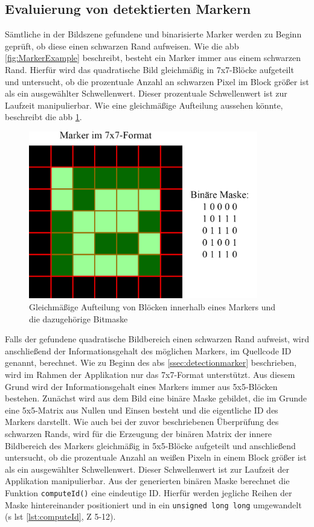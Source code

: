 \newpage

\subsection{Evaluierung von detektierten Markern}
Sämtliche in der Bildszene gefundene und binarisierte Marker werden zu Beginn geprüft, ob diese einen schwarzen Rand aufweisen. Wie die \acs{abb} \ref{fig:MarkerExample} beschreibt, besteht ein Marker immer aus einem schwarzen Rand. Hierfür wird das quadratische Bild gleichmäßig in 7x7-Blöcke aufgeteilt und untersucht, ob die prozentuale Anzahl an schwarzen Pixel im Block größer ist als ein ausgewählter Schwellenwert. Dieser prozentuale Schwellenwert ist zur Laufzeit manipulierbar. Wie eine gleichmäßige Aufteilung aussehen könnte, beschreibt die \acs{abb} \ref{fig:BlockSeparationMarker}.

\begin{figure}[H]
\centering
\includegraphics[width=10cm]{Bilder/Implementierung/marker_blocks.png}
\caption{Gleichmäßige Aufteilung von Blöcken innerhalb eines Markers und die dazugehörige Bitmaske}
\label{fig:BlockSeparationMarker}
\end{figure}

\noindent Falls der gefundene quadratische Bildbereich einen schwarzen Rand aufweist, wird anschließend der Informationsgehalt des möglichen Markers, im Quellcode \glqq ID\grqq{} genannt, berechnet. Wie zu Beginn des \acs{abs} \ref{ssec:detectionmarker} beschrieben, wird im Rahmen der Applikation nur das 7x7-Format unterstützt. Aus diesem Grund wird der Informationsgehalt eines Markers immer aus 5x5-Blöcken bestehen. Zunächst wird aus dem Bild eine binäre Maske gebildet, die im Grunde eine 5x5-Matrix aus Nullen und Einsen besteht und die eigentliche ID des Markers darstellt. Wie auch bei der zuvor beschriebenen Überprüfung des schwarzen Rands, wird für die Erzeugung der binären Matrix der innere Bildbereich des Markers gleichmäßig in 5x5-Blöcke aufgeteilt und anschließend untersucht, ob die prozentuale Anzahl an weißen Pixeln in einem Block größer ist als ein ausgewählter Schwellenwert. Dieser Schwellenwert ist zur Laufzeit der Applikation manipulierbar. Aus der generierten binären Maske berechnet die Funktion \texttt{computeId()} eine eindeutige ID. Hierfür werden jegliche Reihen der Maske hintereinander positioniert und in ein \texttt{unsigned long long} umgewandelt (\acs{s} \acs{lst} \ref{lst:computeId}, \acs{Z} 5-12).

